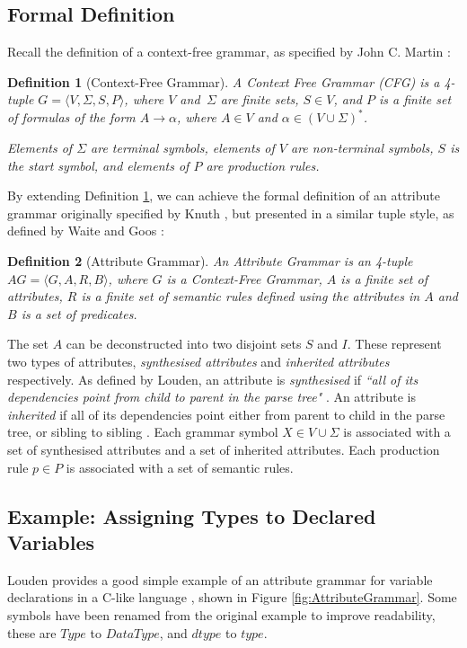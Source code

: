 \documentclass{UoYCSproject}
\newtheorem{definition}{Definition}[section]
\begin{document}
\subsection{Formal Definition}
Recall the definition of a context-free grammar, as specified by John C. Martin
\cite{Martin}:
\begin{definition}[Context-Free Grammar] \label{def:CFG}
    A Context Free Grammar (CFG) is a 4-tuple $G = \langle V, \Sigma, S, 
    P\rangle$, where $V$ and $\,\Sigma$ are finite sets, $S \in V$, and $P$ is a
    finite set of formulas of the form $A \rightarrow \alpha$, where $A \in V$
    and $\alpha \in (V \cup \Sigma)^\ast$.

    Elements of $\Sigma$ are terminal symbols, elements of $V$ are non-terminal
    symbols, $S$ is the start symbol, and elements of $P$ are production rules.
\end{definition}
By extending Definition \ref{def:CFG}, we can achieve the formal definition of 
an attribute grammar originally specified by Knuth \cite{KnuthGrammars}, but 
presented in a similar tuple style, as defined by Waite and Goos 
\cite{WaiteBook}:
\begin{definition}[Attribute Grammar] \label{def:AG}
    An Attribute Grammar is an 4-tuple $AG = \langle G, A, R, B\rangle$, where
    $G$ is a Context-Free Grammar, $A$ is a finite set of attributes, $R$ 
    is a finite set of semantic rules defined using the attributes in $A$ and
    $B$ is a set of predicates.
\end{definition}
The set $A$ can be deconstructed into two disjoint sets $S$ and $I$. These
represent two types of attributes, \textit{synthesised attributes} and 
\textit{inherited attributes} respectively. As defined by Louden, an attribute
is \textit{synthesised} if \textit{``all of its dependencies point from child 
    to parent in the parse tree"} \cite[\S6.2.2, p.~277]{Louden}. An attribute
is \textit{inherited} if all of its dependencies point either from 
parent to child in the parse tree, or sibling to sibling 
\cite[\S6.2.2, p.~278]{Louden}. Each grammar symbol $X \in V \cup \Sigma$ is 
associated with a set of synthesised attributes and a set of inherited 
attributes. Each production rule $p \in P$ is associated with a set of 
semantic rules.

\subsection{Example: Assigning Types to Declared Variables}
Louden provides a good simple example of an attribute grammar for variable
declarations in a C-like language \cite{Louden}, shown in Figure 
\ref{fig:AttributeGrammar}. Some symbols have been renamed from the original
example to improve readability, these are $Type$ to $DataType$, and $dtype$ to
$type$.
\end{document}
